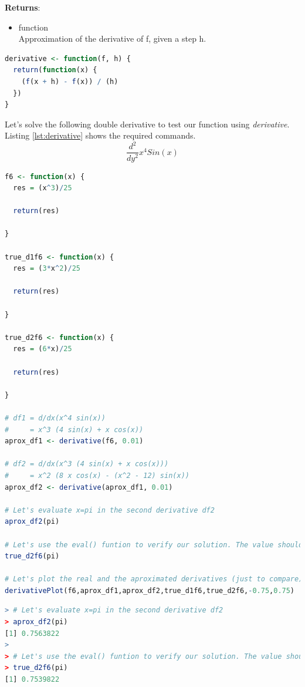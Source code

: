 \documentclass[11pt,a4paper]{article}
\begin{document}
\textbf{Returns}:
\begin{itemize}
  \item {function\\
Approximation of the derivative of f, given a step h.}
\end{itemize}

\clearpage

\begin{lstlisting}[frame=trBL, language=R, caption="The \emph{derivative} function"
\label{lst:derivativeFunct}]
derivative <- function(f, h) {
  return(function(x) {
    (f(x + h) - f(x)) / (h)
  })
}
\end{lstlisting}

Let's solve the following double derivative to test our function using \emph{derivative}. Listing \ref{lst:derivative} shows the required commands.
$$ \frac{d^2}{d y^2} x^4 Sin(x) $$

\begin{lstlisting}[frame=trBL, language=R, caption="Define the function and implement \emph{derivative}"
\label{lst:derivative}]
f6 <- function(x) {
  res = (x^3)/25
  
  return(res)
  
}

true_d1f6 <- function(x) {
  res = (3*x^2)/25
  
  return(res)
  
}

true_d2f6 <- function(x) {
  res = (6*x)/25
  
  return(res)
  
}

# df1 = d/dx(x^4 sin(x))
#     = x^3 (4 sin(x) + x cos(x))
aprox_df1 <- derivative(f6, 0.01)

# df2 = d/dx(x^3 (4 sin(x) + x cos(x)))
#     = x^2 (8 x cos(x) - (x^2 - 12) sin(x))
aprox_df2 <- derivative(aprox_df1, 0.01)

# Let's evaluate x=pi in the second derivative df2
aprox_df2(pi)

# Let's use the eval() funtion to verify our solution. The value should be around df2(pi)
true_d2f6(pi)

# Let's plot the real and the aproximated derivatives (just to compare)
derivativePlot(f6,aprox_df1,aprox_df2,true_d1f6,true_d2f6,-0.75,0.75)
\end{lstlisting}

\clearpage

\begin{lstlisting}[frame=trBL, language=R, caption="Listing \ref{lst:derivative} output"
\label{lst:derivative_out}]
> # Let's evaluate x=pi in the second derivative df2
> aprox_df2(pi)
[1] 0.7563822
> 
> # Let's use the eval() funtion to verify our solution. The value should be around df2(pi)
> true_d2f6(pi)
[1] 0.7539822
\end{lstlisting}
\end{document}
